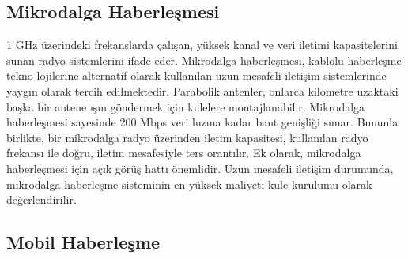 \subsection{Mikrodalga Haberleşmesi} \label{mikrohaberlesme}
1 GHz üzerindeki frekanslarda çalışan, yüksek kanal ve veri iletimi kapasitelerini sunan radyo sistemlerini ifade eder. Mikrodalga haberleşmesi, kablolu haberleşme tekno-lojilerine alternatif olarak kullanılan uzun mesafeli iletişim sistemlerinde yaygın olarak tercih edilmektedir. Parabolik antenler, onlarca kilometre uzaktaki başka bir antene ışın göndermek için kulelere montajlanabilir. Mikrodalga haberleşmesi sayesinde 200 Mbps veri hızına kadar bant genişliği sunar. Bununla birlikte, bir mikrodalga radyo üzerinden iletim kapasitesi, kullanılan radyo frekansı ile doğru, iletim mesafesiyle ters orantılır. Ek olarak, mikrodalga haberleşmesi için açık görüş hattı önemlidir. Uzun mesafeli iletişim durumunda, mikrodalga haberleşme sisteminin en yüksek maliyeti kule kurulumu olarak değerlendirilir\cite{misra2012radio}.

\begin{comment}
\subsection{Ultra Yüksek Frekans Haberleşmesi}

0,3 -- 1 Ghz arasındaki frekans bandında çalışan haberleşme sistemi olarak tanım-lanan \gls{uhf} haberleşmesi mikrodalga haberleşmesinden fark-lı olarak görüş hattı olmaksı-zın veri iletimi imkanı sunar. Haberleşme anteninin boyutlarına bağlı olarak 30kmyi aşan bir mesafeye 192 kb/s’lik bir bant genişliğinde veri iletimi yapabilir. \gls{uhf} haberleşmesi düşük bant gerektiren özellikle görüş hattının zor olduğu arazilerde yaygın olduğu uygulamalar için makul bir haberleşme çözümüdür\cite{perez2002path}.

\end{comment}

\subsection{Mobil Haberleşme}

